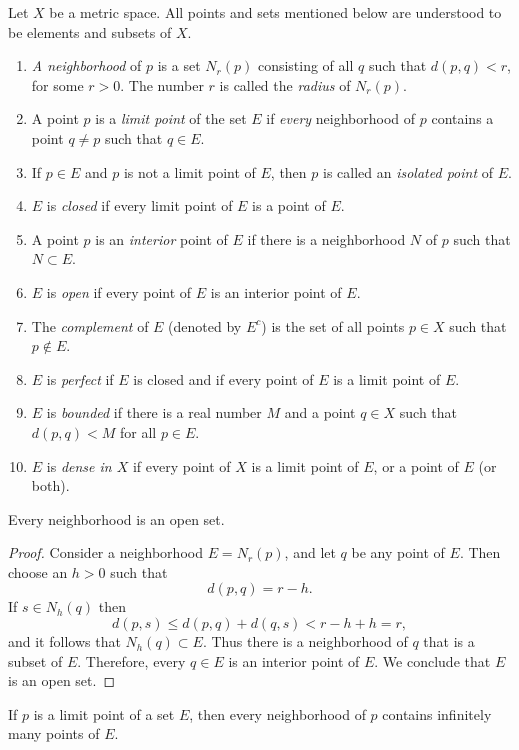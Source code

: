 \begin{definition}
    Let $X$ be a metric space. All points and sets mentioned below are understood to be elements and subsets of $X$.
\begin{enumerate}
\item[(a)] \emph{A neighborhood} of $p$ is a set $N_r(p)$ consisting of all $q$ such that $d(p,q)<r$, for some $r>0$.
The number $r$ is called the \emph{radius} of $N_r(p)$.
\item[(b)] A point $p$ is a \emph{limit point} of the set $E$ if \emph{every} neighborhood of $p$ contains a point $q \neq p$ such that $q \in E$.
\item[(c)] If $p \in E$ and $p$ is not a limit point of $E$, then $p$ is called an \emph{isolated point} of $E$.
\item[(d)] $E$ is \emph{closed} if every limit point of $E$ is a point of $E$.
\item[(e)] A point $p$ is an \emph{interior} point of $E$ if there is a neighborhood $N$ of $p$ such that $N \subset E$.
\item[(f)] $E$ is \emph{open} if every point of $E$ is an interior point of $E$.
\item[(g)] The \emph{complement} of $E$ (denoted by $E^c$) is the set of all points $p \in X$ such that $p \notin E$.
\item[(h)] $E$ is \emph{perfect} if $E$ is closed and if every point of $E$ is a limit point of $E$.
\item[(i)] $E$ is \emph{bounded} if there is a real number $M$ and a point $q \in X$ such that $d(p,q)<M$ for all $p \in E$.    
\item[(j)] $E$ is \emph{dense in $X$} if every point of $X$ is a limit point of $E$, or a point of $E$ (or both).
\end{enumerate}
\end{definition}

\begin{theorem}
    Every neighborhood is an open set.
\end{theorem}
\begin{proof}
Consider a neighborhood $E=N_r(p)$, and let $q$ be any point of $E$.
Then choose an $h>0$ such that
\[
d(p,q)=r-h.
\]
If $s \in N_h(q)$ then
\[
d(p,s) \leq d(p,q)+d(q,s) < r-h+h=r,
\]
and it follows that $N_h(q) \subset E$. 
Thus there is a neighborhood of $q$ that is a subset of $E$.
Therefore, every $q \in E$ is an interior point of $E$.
We conclude that $E$ is an open set.
\end{proof}
\begin{theorem}\label{thm:limit_cluster}
    If $p$ is a limit point of a set $E$, then every neighborhood of $p$ contains infinitely many points of $E$.
\end{theorem}

